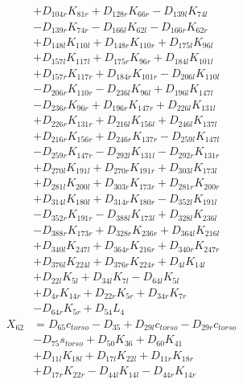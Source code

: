 \begin{multicols}{2}
\begin{align}
&+ D_{104r}K_{81r} + D_{128r}K_{66r} - D_{139l}K_{74l}  \nonumber \\
&- D_{139r}K_{74r} - D_{166l}K_{62l} - D_{166r}K_{62r}  \nonumber \\
&+ D_{148l}K_{110l} + D_{148r}K_{110r} + D_{175l}K_{96l}  \nonumber \\
&+ D_{157l}K_{117l} + D_{175r}K_{96r} + D_{184l}K_{101l}  \nonumber \\
&+ D_{157r}K_{117r} + D_{184r}K_{101r} - D_{206l}K_{110l}  \nonumber \\
&- D_{206r}K_{110r} - D_{236l}K_{96l} + D_{196l}K_{147l}  \nonumber \\
&- D_{236r}K_{96r} + D_{196r}K_{147r} + D_{226l}K_{131l}  \nonumber \\
&+ D_{226r}K_{131r} + D_{216l}K_{156l} + D_{246l}K_{137l}  \nonumber \\
&+ D_{216r}K_{156r} + D_{246r}K_{137r} - D_{259l}K_{147l}  \nonumber \\
&- D_{259r}K_{147r} - D_{292l}K_{131l} - D_{292r}K_{131r}  \nonumber \\
&+ D_{270l}K_{191l} + D_{270r}K_{191r} + D_{303l}K_{173l}  \nonumber \\
&+ D_{281l}K_{200l} + D_{303r}K_{173r} + D_{281r}K_{200r}  \nonumber \\
&+ D_{314l}K_{180l} + D_{314r}K_{180r} - D_{352l}K_{191l}  \nonumber \\
&- D_{352r}K_{191r} - D_{388l}K_{173l} + D_{328l}K_{236l}  \nonumber \\
&- D_{388r}K_{173r} + D_{328r}K_{236r} + D_{364l}K_{216l}  \nonumber \\
&+ D_{340l}K_{247l} + D_{364r}K_{216r} + D_{340r}K_{247r}  \nonumber \\
&+ D_{376l}K_{224l} + D_{376r}K_{224r} + D_{4l}K_{14l}  \nonumber \\
&+ D_{22l}K_{5l} + D_{34l}K_{7l} - D_{64l}K_{5l}  \nonumber \\
&+ D_{4r}K_{14r} + D_{22r}K_{5r} + D_{34r}K_{7r}  \nonumber \\
&- D_{64r}K_{5r} + D_{54}L_4 \nonumber \\
X_{62} &= D_{65}c_{torso} - D_{35} + D_{29l}c_{torso} - D_{29r}c_{torso}  \nonumber \\
&- D_{75}s_{torso} + D_{50}K_{36} + D_{60}K_{41}  \nonumber \\
&+ D_{11l}K_{18l} + D_{17l}K_{22l} + D_{11r}K_{18r}  \nonumber \\
&+ D_{17r}K_{22r} - D_{44l}K_{14l} - D_{44r}K_{14r}  \nonumber \\

\end{align}
\end{multicols}

